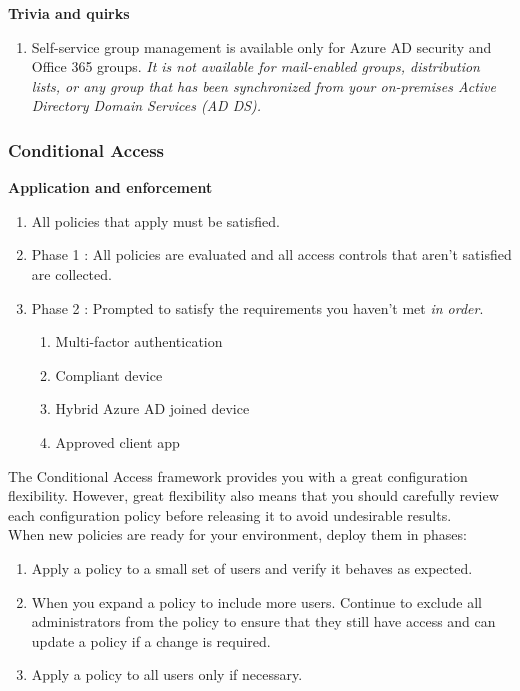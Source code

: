 \textbf{Trivia and quirks} 
\begin{enumerate}
\item Self-service group management is available only for Azure AD security and Office 365 groups. \textit{It is not available for mail-enabled groups, distribution lists, or any group that has been synchronized from your on-premises Active Directory Domain Services (AD DS).}
\end{enumerate}

\subsubsection{Conditional Access}
\textbf{Application and enforcement}
\begin{enumerate}
\item All policies that apply must be satisfied.
\item Phase 1 : All policies are evaluated and all access controls that aren't satisfied are collected.
\item Phase 2 : Prompted to satisfy the requirements you haven't met \textit{in order}.
	\begin{enumerate}
	\item Multi-factor authentication
	\item Compliant device
	\item Hybrid Azure AD joined device
	\item Approved client app
	\end{enumerate}
\end{enumerate}
The Conditional Access framework provides you with a great configuration flexibility. However, great flexibility also means that you should carefully review each configuration policy before releasing it to avoid undesirable results.  \\

When new policies are ready for your environment, deploy them in phases:
\begin{enumerate}
\item Apply a policy to a small set of users and verify it behaves as expected.
\item When you expand a policy to include more users. Continue to exclude all administrators from the policy to ensure that they still have access and can update a policy if a change is required.
\item Apply a policy to all users only if necessary.
\end{enumerate}

